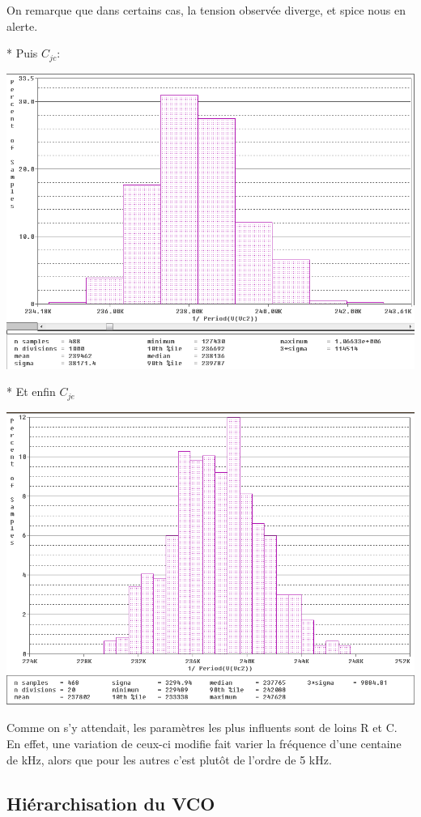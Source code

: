 On remarque que dans certains cas, la tension observée diverge, et spice nous en alerte.

* Puis $C_{jc}$:

\includegraphics[width=\linewidth]{../img/montecarlo_Cjc.png}


* Et enfin $C_{je}$

\includegraphics[width=\linewidth]{../img/montecarlo_Cje.png}


Comme on s’y attendait, les paramètres les plus influents sont de loins R et C.
En effet, une variation de ceux-ci modifie fait varier la fréquence d’une centaine de \si{\kilo\hertz}, alors que pour les autres c’est plutôt de l’ordre de 5 \si{\kilo\hertz}.
\subsection{Hiérarchisation du VCO}

